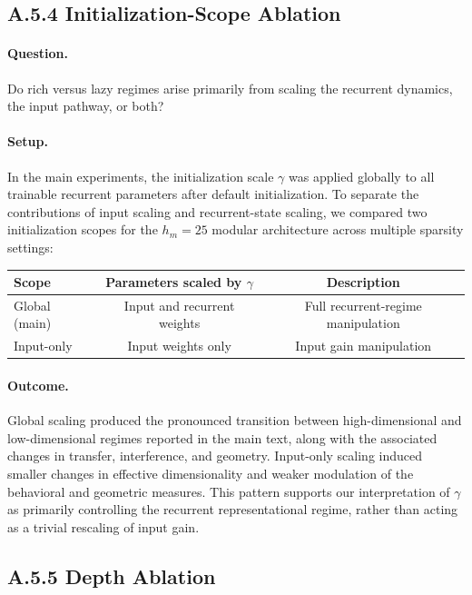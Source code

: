 \documentclass{article}
\theoremstyle{plain}
\theoremstyle{definition}
\theoremstyle{remark}
\begin{document}
\subsection{A.5.4 Initialization-Scope Ablation}

\paragraph{Question.}
Do rich versus lazy regimes arise primarily from scaling the recurrent dynamics, the input pathway, or both?

\paragraph{Setup.}
In the main experiments, the initialization scale $\gamma$ was applied globally to all trainable recurrent parameters after default initialization.
To separate the contributions of input scaling and recurrent-state scaling, we compared two initialization scopes for the $h_m = 25$ modular architecture across multiple sparsity settings:

\begin{center}
\begin{tabular}{lcc}
\toprule
Scope & Parameters scaled by $\gamma$ & Description \\
\midrule
Global (main) & Input and recurrent weights & Full recurrent-regime manipulation \\
Input-only & Input weights only & Input gain manipulation \\
\bottomrule
\end{tabular}
\end{center}

\paragraph{Outcome.}
Global scaling produced the pronounced transition between high-dimensional and low-dimensional regimes reported in the main text, along with the associated changes in transfer, interference, and geometry. Input-only scaling induced smaller changes in effective dimensionality and weaker modulation of the behavioral and geometric measures. This pattern supports our interpretation of $\gamma$ as primarily controlling the recurrent representational regime, rather than acting as a trivial rescaling of input gain.

\subsection{A.5.5 Depth Ablation}
\end{document}
